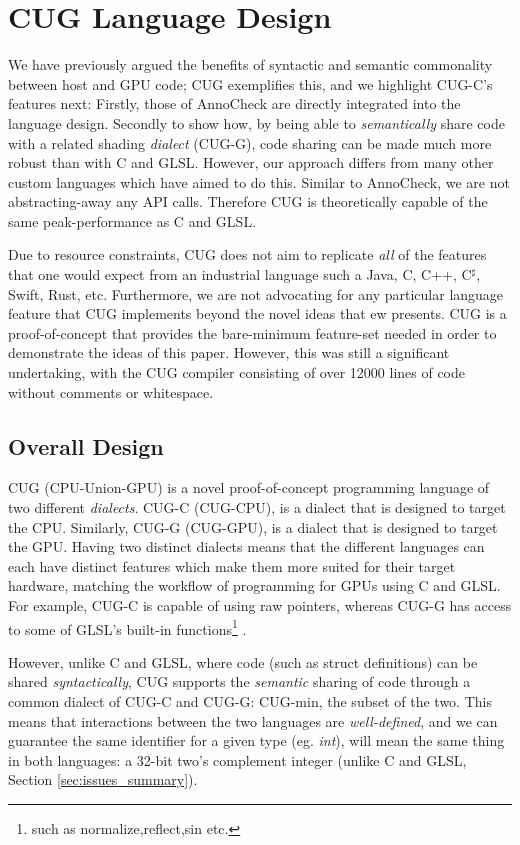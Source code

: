\documentclass[a4paper,12pt,twoside,openright]{report}
\def\compilerloccount{12000 }
\begin{document}
\section{CUG Language Design}

\label{sec:design_languages}

We have previously argued the benefits of syntactic and semantic commonality
between host and GPU code; CUG exemplifies this, and we highlight CUG-C's
features next: Firstly, those of AnnoCheck are directly integrated into the
language design. Secondly to show how, by being able to \textit{semantically}
share code with a related shading \textit{dialect} (CUG-G), code sharing can be
made much more robust than with C and GLSL. However, our approach differs from
many other custom languages which have aimed to do this. Similar to AnnoCheck,
we are not abstracting-away any API calls. Therefore CUG is theoretically
capable of the same peak-performance as C and GLSL.

Due to resource constraints, CUG does not aim to replicate \textit{all} of the
features that one would expect from an industrial language such a Java, C, C++,
C$^\sharp$, Swift, Rust, etc. Furthermore, we are not advocating for any
particular language feature that CUG implements beyond the novel ideas that ew
presents. CUG is a proof-of-concept that provides the bare-minimum feature-set
needed in order to demonstrate the ideas of this paper. However, this was still
a significant undertaking, with the CUG compiler consisting of over
\compilerloccount lines of code without comments or whitespace.

\subsection{Overall Design}

CUG (CPU-Union-GPU) is a novel proof-of-concept programming language of two
different \textit{dialects}. CUG-C (CUG-CPU), is a dialect that is designed to
target the CPU. Similarly, CUG-G (CUG-GPU), is a dialect that is designed to
target the GPU. Having two distinct dialects means that the different languages
can each have distinct features which make them more suited for their target
hardware, matching the workflow of programming for GPUs using C and GLSL. For
example, CUG-C is capable of using raw pointers, whereas CUG-G has access to
some of GLSL's built-in functions\footnote{such as normalize,reflect,sin etc.}
\cite{GLSLBuiltIn}.

However, unlike C and GLSL, where code (such as struct definitions) can be
shared \textit{syntactically}, CUG supports the \textit{semantic} sharing of
code through a common dialect of CUG-C and CUG-G: CUG-min, the subset of the
two. This means that interactions between the two languages are
\textit{well-defined}, and we can guarantee the same identifier for a given
type (eg. \textit{int}), will mean the same thing in both languages: a 32-bit
two's complement integer (unlike C and GLSL, Section \ref{sec:issues_summary}).
\end{document}
